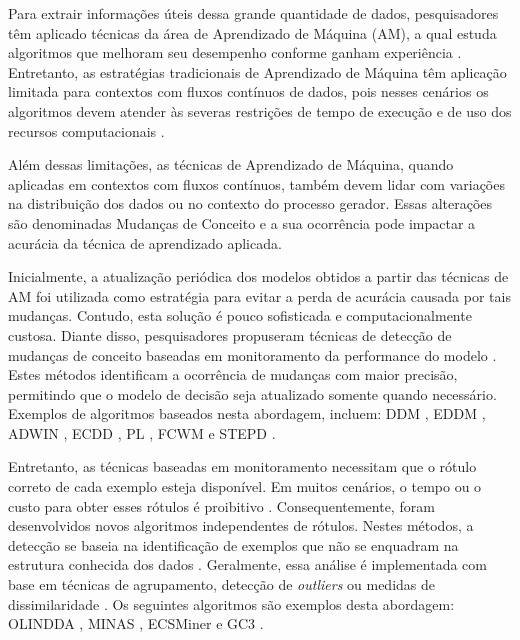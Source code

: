 \documentclass[msc, classic, a4paper]{ufbathesis}
\begin{document}
Para extrair informações úteis dessa grande quantidade de dados,
pesquisadores têm aplicado técnicas da área de Aprendizado de Máquina (AM),
a qual estuda algoritmos que melhoram seu desempenho conforme ganham experiência \cite{Mitchell:1997:ML:541177}.
%
Entretanto, as estratégias tradicionais de Aprendizado de Máquina têm aplicação limitada para contextos com fluxos contínuos de dados,
pois nesses cenários os algoritmos devem atender às severas restrições de tempo de execução e de uso dos recursos computacionais \cite{bifet2009data}.

Além dessas limitações,
as técnicas de Aprendizado de Máquina,
quando aplicadas em contextos com fluxos contínuos,
também devem lidar com variações na distribuição dos dados ou no contexto do processo gerador.
%
Essas alterações são denominadas Mudanças de Conceito \cite{Gama:2010:KDD:1855075} e
a sua ocorrência pode impactar a acurácia da técnica de aprendizado aplicada.

Inicialmente, a atualização periódica dos modelos obtidos a partir das técnicas de AM foi utilizada como estratégia para evitar a perda de acurácia causada por tais mudanças.
%
Contudo, esta solução é pouco sofisticada e computacionalmente custosa.
%
Diante disso, pesquisadores propuseram técnicas de detecção de mudanças de conceito baseadas em monitoramento da performance do modelo \cite{Gama:2014:SCD:2597757.2523813}.
%
Estes métodos identificam a ocorrência de mudanças com maior precisão, permitindo que o modelo de decisão seja atualizado somente quando necessário.
%
Exemplos de algoritmos baseados nesta abordagem, incluem:
DDM \cite{GamaMCR04}, EDDM \cite{EDDM},
ADWIN \cite{BifetG07}, ECDD \cite{Ross:2012:EWM:2076039.2076307},
PL \cite{Bach:PL:2008}, FCWM \cite{FCWM} e STEPD \cite{STEPD}.

Entretanto, as técnicas baseadas em monitoramento necessitam que o rótulo correto de cada exemplo esteja disponível.
%
Em muitos cenários, o tempo ou o custo para obter esses rótulos é proibitivo \cite{Aggarwal:2006:DSM:1196418}.
%
Consequentemente, foram desenvolvidos novos algoritmos independentes de rótulos.
Nestes métodos, a detecção se baseia na identificação de exemplos que não se enquadram na estrutura conhecida dos dados \cite{Spinosa:2007:OCA:1244002.1244107}.
%
Geralmente, essa análise é implementada com base em técnicas de agrupamento, detecção de \textit{outliers} ou medidas de dissimilaridade \cite{Ryu:Kantardzic:2012}.
%
Os seguintes algoritmos são exemplos desta abordagem:
OLINDDA \cite{Spinosa:2007:OCA:1244002.1244107},
MINAS \cite{Faria:2013:NDA:2480362.2480515},
ECSMiner \cite{Masud:2011:CNC:1978259.1978529} e
GC3 \cite{Sethi2016b:GC3}.
\end{document}
